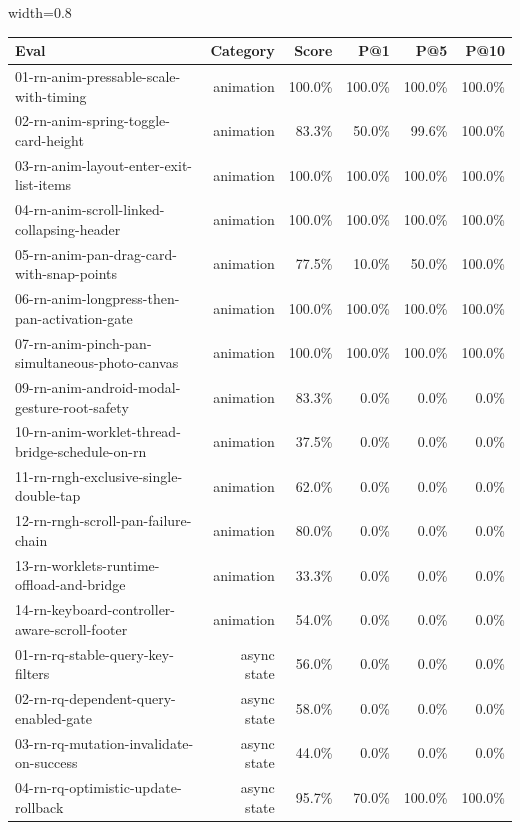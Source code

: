 \begin{table}[htbp]
\centering
\begin{adjustbox}{width=0.8\textwidth}
\begin{tabular}{lrrrrr}
\toprule
Eval & Category & Score & P@1 & P@5 & P@10 \\
\midrule
01-rn-anim-pressable-scale-with-timing & animation & 100.0\% & 100.0\% & 100.0\% & 100.0\% \\
02-rn-anim-spring-toggle-card-height & animation & 83.3\% & 50.0\% & 99.6\% & 100.0\% \\
03-rn-anim-layout-enter-exit-list-items & animation & 100.0\% & 100.0\% & 100.0\% & 100.0\% \\
04-rn-anim-scroll-linked-collapsing-header & animation & 100.0\% & 100.0\% & 100.0\% & 100.0\% \\
05-rn-anim-pan-drag-card-with-snap-points & animation & 77.5\% & 10.0\% & 50.0\% & 100.0\% \\
06-rn-anim-longpress-then-pan-activation-gate & animation & 100.0\% & 100.0\% & 100.0\% & 100.0\% \\
07-rn-anim-pinch-pan-simultaneous-photo-canvas & animation & 100.0\% & 100.0\% & 100.0\% & 100.0\% \\
09-rn-anim-android-modal-gesture-root-safety & animation & 83.3\% & 0.0\% & 0.0\% & 0.0\% \\
10-rn-anim-worklet-thread-bridge-schedule-on-rn & animation & 37.5\% & 0.0\% & 0.0\% & 0.0\% \\
11-rn-rngh-exclusive-single-double-tap & animation & 62.0\% & 0.0\% & 0.0\% & 0.0\% \\
12-rn-rngh-scroll-pan-failure-chain & animation & 80.0\% & 0.0\% & 0.0\% & 0.0\% \\
13-rn-worklets-runtime-offload-and-bridge & animation & 33.3\% & 0.0\% & 0.0\% & 0.0\% \\
14-rn-keyboard-controller-aware-scroll-footer & animation & 54.0\% & 0.0\% & 0.0\% & 0.0\% \\
01-rn-rq-stable-query-key-filters & async state & 56.0\% & 0.0\% & 0.0\% & 0.0\% \\
02-rn-rq-dependent-query-enabled-gate & async state & 58.0\% & 0.0\% & 0.0\% & 0.0\% \\
03-rn-rq-mutation-invalidate-on-success & async state & 44.0\% & 0.0\% & 0.0\% & 0.0\% \\
04-rn-rq-optimistic-update-rollback & async state & 95.7\% & 70.0\% & 100.0\% & 100.0\% \\

\end{tabular}
\end{adjustbox}
\end{table}
